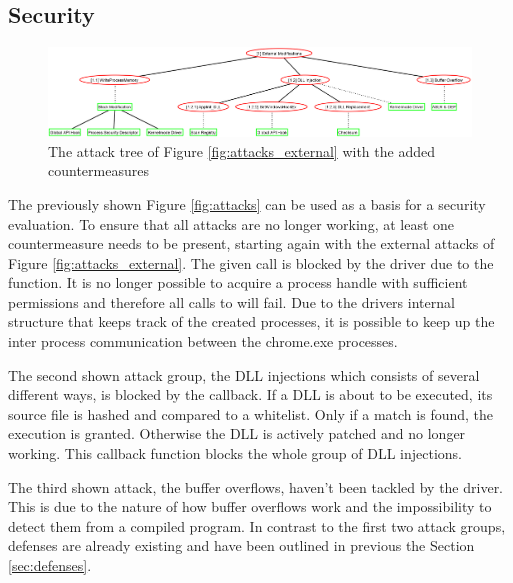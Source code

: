 \subsection{Security}
\begin{figure}[!htbp]
\centering
\includegraphics[angle=90,scale=0.3]{sections/adtrees/ExternalModifications.png}
\caption{The attack tree of Figure \ref{fig:attacks_external} with the added countermeasures}
\label{fig:attacks_external_def}
\end{figure}
The previously shown Figure \ref{fig:attacks} can be used as a basis for a security evaluation. To ensure that all attacks are no longer working, at least one countermeasure needs to be present, starting again with the external attacks of Figure \ref{fig:attacks_external}. The given  call is blocked by the driver due to the  function. It is no longer possible to acquire a process handle with sufficient permissions and therefore all calls to  will fail. Due to the drivers internal structure that keeps track of the created processes, it is possible to keep up the inter process communication between the chrome.exe processes. 

The second shown attack group, the DLL injections which consists of several different ways, is blocked by the  callback. If a DLL is about to be executed, its source file is hashed and compared to a whitelist. Only if a match is found, the execution is granted. Otherwise the DLL is actively patched and no longer working. This callback function blocks the whole group of DLL injections.

The third shown attack, the buffer overflows, haven't been tackled by the driver. This is due to the nature of how buffer overflows work and the impossibility to detect them from a compiled program. In contrast to the first two attack groups, defenses are already existing and have been outlined in previous the Section \ref{sec:defenses}.

